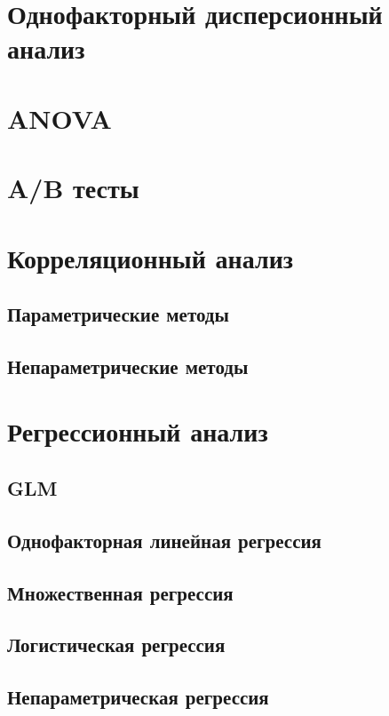 \documentclass[]{scrartcl}
\begin{document}
\section{Однофакторный дисперсионный анализ}

\section{ANOVA}

\section{A/B тесты}

\section{Корреляционный анализ}

\subsection{Параметрические методы}

\subsection{Непараметрические методы}

\section{Регрессионный анализ}

\subsection{GLM}

\subsection{Однофакторная линейная регрессия}

\subsection{Множественная регрессия}

\subsection{Логистическая регрессия}

\subsection{Непараметрическая регрессия}
\end{document}
